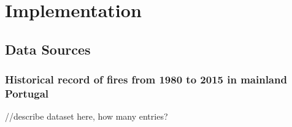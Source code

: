 \chapter{Implementation}
\label{sec:implementation}

\section{Data Sources}

\subsection{Historical record of fires from 1980 to 2015 in mainland Portugal \cite{centraldedados_incendios_website}\cite{centraldedados_incendios} \cite{icnf2024}}

//describe dataset here, how many entries?
\label{historical_sites_no_coords}

